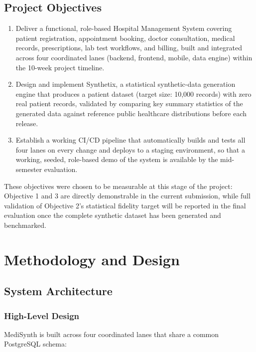 \documentclass[12pt,a4paper]{report}
\begin{document}
\section{Project Objectives}

\begin{enumerate}[leftmargin=*]
    \item Deliver a functional, role-based Hospital Management System covering patient registration, appointment booking, doctor consultation, medical records, prescriptions, lab test workflows, and billing, built and integrated across four coordinated lanes (backend, frontend, mobile, data engine) within the 10-week project timeline.
    \item Design and implement Synthetix, a statistical synthetic-data generation engine that produces a patient dataset (target size: 10,000 records) with zero real patient records, validated by comparing key summary statistics of the generated data against reference public healthcare distributions before each release.
    \item Establish a working CI/CD pipeline that automatically builds and tests all four lanes on every change and deploys to a staging environment, so that a working, seeded, role-based demo of the system is available by the mid-semester evaluation.
\end{enumerate}

These objectives were chosen to be measurable at this stage of the project: Objective 1 and 3 are directly demonstrable in the current submission, while full validation of Objective 2's statistical fidelity target will be reported in the final evaluation once the complete synthetic dataset has been generated and benchmarked.

\chapter{Methodology and Design}

\section{System Architecture}

\subsection{High-Level Design}

MediSynth is built across four coordinated lanes that share a common PostgreSQL schema:
\end{document}
